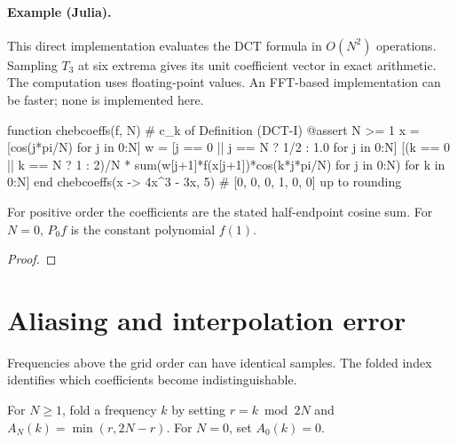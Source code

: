 \paragraph{Example (Julia).} This direct implementation evaluates the DCT formula in $O(N^2)$ operations. Sampling $T_3$ at six extrema gives its unit coefficient vector in exact arithmetic. The computation uses floating-point values. An FFT-based implementation can be faster; none is implemented here.

\begin{juliacode}
function chebcoeffs(f, N)            # c_k of Definition (DCT-I)
    @assert N >= 1
    x = [cos(j*pi/N) for j in 0:N]
    w = [j == 0 || j == N ? 1/2 : 1.0 for j in 0:N]
    [(k == 0 || k == N ? 1 : 2)/N *
        sum(w[j+1]*f(x[j+1])*cos(k*j*pi/N) for j in 0:N) for k in 0:N]
end
chebcoeffs(x -> 4x^3 - 3x, 5)        # [0, 0, 0, 1, 0, 0] up to rounding
\end{juliacode}

\begin{supporting}

\begin{theorem}
\label{thm:extrema-dct-definition}
\leanok
For positive order the coefficients are the stated half-endpoint cosine sum.
For $N=0$, $P_0f$ is the constant polynomial $f(1)$.
\end{theorem}
\begin{proof}
\leanok
\end{proof}

\end{supporting}

\section{Aliasing and interpolation error}\label{sec:textbook-interpolation-aliasing}

Frequencies above the grid order can have identical samples. The folded index identifies which coefficients become indistinguishable.

\begin{definition}
\label{def:extrema-aliasing}
\leanok
For $N\ge1$, fold a frequency $k$ by setting $r=k\bmod 2N$ and
$A_N(k)=\min(r,2N-r)$. For $N=0$, set $A_0(k)=0$.
\end{definition}

